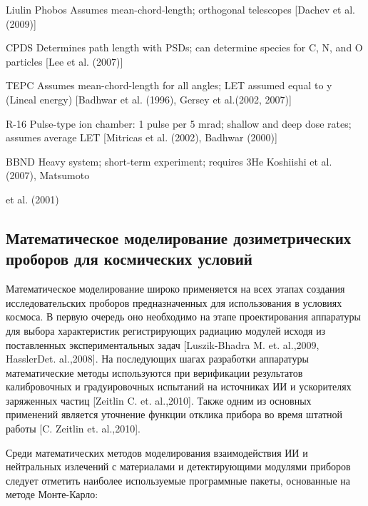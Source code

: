 \documentclass[a4paper,portrait,12pt]{article}
\begin{document}
{{{{Liulin Phobos Assumes mean-chord-length; orthogonal telescopes [Dachev et al. (2009)]


CPDS Determines path length with PSDs; can determine species for C, N, and O particles [Lee et al. (2007)]


TEPC Assumes mean-chord-length for all angles; LET assumed equal to y (Lineal energy) [Badhwar et al. (1996), Gersey et al.(2002, 2007)]


R-16 Pulse-type ion chamber: 1 pulse per 5 mrad; shallow and deep dose rates; assumes average LET [Mitricas et al. (2002), Badhwar (2000)]


BBND Heavy system; short-term experiment; requires 3He Koshiishi et al. (2007), Matsumoto


et al. (2001)





\subsection*{	\textbf{ Математическое моделирование дозиметрических проборов для космических условий}}

Математическое моделирование широко применяется на всех этапах создания исследовательских проборов предназначенных для использования в условиях космоса. В первую очередь оно необходимо на этапе проектирования аппаратуры для выбора характеристик регистрирующих радиацию модулей исходя из поставленных экспериментальных задач [{\footnotesize Luszik-Bhadra M. }{\footnotesize et}{\footnotesize . }{\footnotesize al}{\footnotesize .}{\footnotesize ,}{\footnotesize  2009, }{\footnotesize Hassler}{\footnotesize  }{\footnotesize D}{\footnotesize   }{\footnotesize et}{\footnotesize . }{\footnotesize al}{\footnotesize .}{\footnotesize ,}{\footnotesize  2008}{\footnotesize ]}. На последующих шагах разработки аппаратуры математические методы используются при верификации результатов калибровочных и градуировочных испытаний на источниках ИИ и ускорителях заряженных частиц [Zeitlin C. {\footnotesize et}{\footnotesize . }{\footnotesize al}{\footnotesize .}{\footnotesize ,}{\footnotesize  20}{\footnotesize 10}]. Также одним из основных применений является уточнение функции отклика прибора во время штатной работы [C. Zeitlin {\footnotesize et}{\footnotesize . }{\footnotesize al}{\footnotesize .}{\footnotesize ,}{\footnotesize  20}{\footnotesize 10}]. 


Среди математических методов моделирования взаимодействия ИИ и нейтральных излечений с материалами и детектирующими модулями приборов следует отметить наиболее используемые программные пакеты, основанные на методе Монте-Карло:


}}}}
\end{document}

